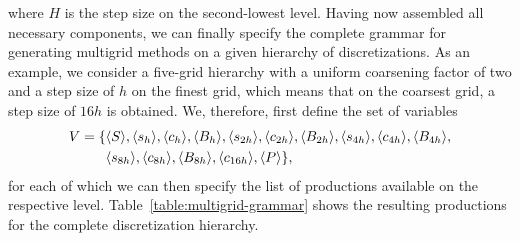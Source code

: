 where $H$ is the step size on the second-lowest level.
\setcounter{equation}{116}
Having now assembled all necessary components, we can finally specify the complete grammar for generating multigrid methods on a given hierarchy of discretizations.
As an example, we consider a five-grid hierarchy with a uniform coarsening factor of two and a step size of $h$ on the finest grid, which means that on the coarsest grid, a step size of $16h$ is obtained.
We, therefore, first define the set of variables 
\begin{equation}
\begin{split}
	V = \{ & \langle S \rangle, \langle s_h \rangle, \langle c_h \rangle, \langle B_h \rangle, \langle s_{2h} \rangle, \langle c_{2h} \rangle, \langle B_{2h} \rangle, \langle s_{4h} \rangle, \langle c_{4h} \rangle, \langle B_{4h} \rangle, \\
	& \langle s_{8h} \rangle, \langle c_{8h} \rangle, \langle B_{8h} \rangle, \langle c_{16h} \rangle, \langle P \rangle \},
\end{split}
\label{eq:multigrid-grammar-variables}
\end{equation}
for each of which we can then specify the list of productions available on the respective level. 
Table~\ref{table:multigrid-grammar} shows the resulting productions for the complete discretization hierarchy.
